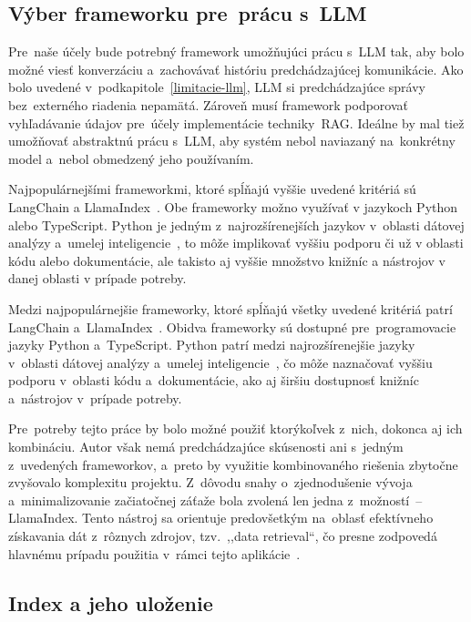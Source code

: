 \subsection{Výber frameworku pre~prácu s~LLM}

Pre~naše účely bude potrebný framework umožňujúci prácu s~LLM tak, aby bolo možné viesť konverzáciu a~zachovávať históriu predchádzajúcej komunikácie. Ako bolo uvedené v~podkapitole~\ref{limitacie-llm}, LLM si predchádzajúce správy bez~externého riadenia nepamätá. Zároveň musí framework podporovať vyhľadávanie údajov pre~účely implementácie techniky~RAG. Ideálne by mal tiež umožňovať abstraktnú prácu s~LLM, aby systém nebol naviazaný na~konkrétny model a~nebol obmedzený jeho používaním.

Najpopulárnejšími frameworkmi, ktoré spĺňajú vyššie uvedené kritériá sú LangChain a LlamaIndex~\cite{top-rag-frameworks}. Obe frameworky možno využívať v jazykoch Python alebo TypeScript. Python je jedným z~najrozšírenejších jazykov v~oblasti dátovej analýzy a~umelej inteligencie~\cite{top-data-science-languages}, to môže implikovať vyššiu podporu či už v oblasti kódu alebo dokumentácie, ale takisto aj vyššie množstvo knižníc a nástrojov v danej oblasti v prípade potreby.

Medzi najpopulárnejšie frameworky, ktoré spĺňajú všetky uvedené kritériá patrí LangChain a~LlamaIndex~\cite{top-rag-frameworks}. Obidva frameworky sú dostupné pre~programovacie jazyky Python a~TypeScript. Python patrí medzi najrozšírenejšie jazyky v~oblasti dátovej analýzy a~umelej inteligencie~\cite{top-data-science-languages}, čo môže naznačovať vyššiu podporu v~oblasti kódu a~dokumentácie, ako aj širšiu dostupnosť knižníc a~nástrojov v~prípade potreby.

Pre~potreby tejto práce by bolo možné použiť ktorýkoľvek z~nich, dokonca aj ich kombináciu. Autor však nemá predchádzajúce skúsenosti ani s~jedným z~uvedených frameworkov, a~preto by využitie kombinovaného riešenia zbytočne zvyšovalo komplexitu projektu. Z~dôvodu snahy o~zjednodušenie vývoja a~minimalizovanie začiatočnej záťaže bola zvolená len jedna z~možností~-- LlamaIndex. Tento nástroj sa orientuje predovšetkým na~oblasť efektívneho získavania dát z~rôznych zdrojov, tzv.~,,data retrieval``, čo presne zodpovedá hlavnému prípadu použitia v~rámci tejto aplikácie~\cite{langchain-vs-llamaindex}.

\subsection{Index a jeho uloženie}

